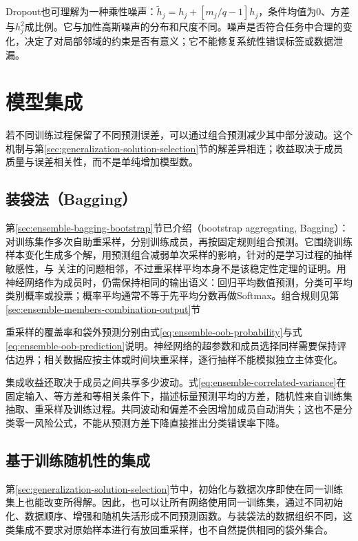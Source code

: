 Dropout也可理解为一种乘性噪声：$\tilde h_j=h_j+[m_j/q-1]h_j$，条件均值为0、方差与$h_j^2$成比例。它与加性高斯噪声的分布和尺度不同。噪声是否符合任务中合理的变化，决定了对局部邻域的约束是否有意义；它不能修复系统性错误标签或数据泄漏。

\section{模型集成}
\label{sec:generalization-ensembles}

若不同训练过程保留了不同预测误差，可以通过组合预测减少其中部分波动。这个机制与第\ref{sec:generalization-solution-selection}节的解差异相连；收益取决于成员质量与误差相关性，而不是单纯增加模型数。

\subsection{装袋法（Bagging）}
\label{sec:generalization-bagging}

第\ref{sec:ensemble-bagging-bootstrap}节已介绍（bootstrap aggregating, Bagging）：对训练集作多次自助重采样，分别训练成员，再按固定规则组合预测。它围绕训练样本变化生成多个解，用预测组合减弱单次采样的影响，针对的是学习过程的抽样敏感性，与
关注的问题相邻，不过重采样平均本身不是该稳定性定理的证明。用神经网络作为成员时，仍需保持相同的输出语义：回归平均数值预测，分类可平均类别概率或投票；概率平均通常不等于先平均分数再做Softmax。组合规则见第\ref{sec:ensemble-members-combination-output}节

重采样的覆盖率和袋外预测分别由式\eqref{eq:ensemble-oob-probability}与式\eqref{eq:ensemble-oob-prediction}说明。神经网络的超参数和成员选择同样需要保持评估边界；相关数据应按主体或时间块重采样，逐行抽样不能模拟独立主体变化。

集成收益还取决于成员之间共享多少波动。式\eqref{eq:ensemble-correlated-variance}在固定输入、等方差和等相关条件下，描述标量预测平均的方差，随机性来自训练集抽取、重采样及训练过程。共同波动和偏差不会因增加成员自动消失；这也不是分类零一风险公式，不能从预测方差下降直接推出分类错误率下降。

\subsection{基于训练随机性的集成}
\label{sec:generalization-randomness-ensemble}

第\ref{sec:generalization-solution-selection}节中，初始化与数据次序即使在同一训练集上也能改变所得解。因此，也可以让所有网络使用同一训练集，通过不同初始化、数据顺序、增强和随机失活形成不同预测函数。与装袋法的数据组织不同，这类集成不要求对原始样本进行有放回重采样，也不自然提供相同的袋外集合。

